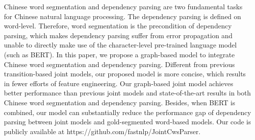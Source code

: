 Chinese word segmentation and dependency parsing are two fundamental tasks for Chinese natural language processing. The dependency parsing is defined on word-level. Therefore, word segmentation is the precondition of dependency parsing, which makes dependency parsing suffer from error propagation and unable to directly make use of the character-level pre-trained language model (such as BERT). In this paper, we propose a graph-based model to integrate Chinese word segmentation and dependency parsing. Different from previous transition-based joint models, our proposed model is more concise, which results in fewer efforts of feature engineering. Our graph-based joint model achieves better performance than previous joint models and state-of-the-art results in both Chinese word segmentation and dependency parsing. Besides, when BERT is combined, our model can substantially reduce the performance gap of dependency parsing between joint models and gold-segmented word-based models. Our code is publicly available at https://github.com/fastnlp/JointCwsParser.